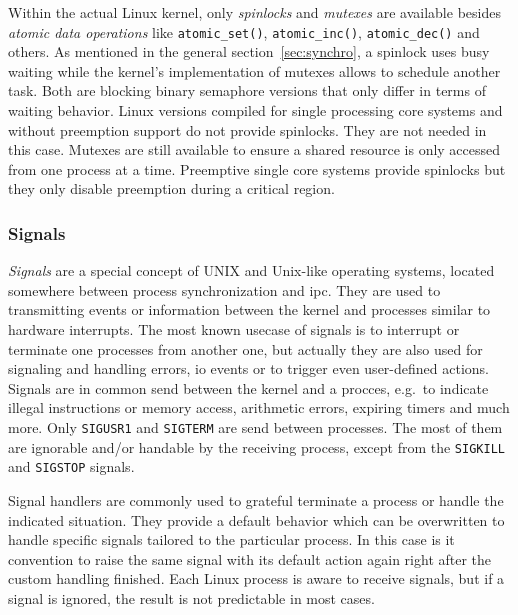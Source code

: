 Within the actual Linux kernel, only \textit{spinlocks} and \textit{mutexes} are available besides \textit{atomic data operations} like \texttt{atomic\_set()}, \texttt{atomic\_inc()}, \texttt{atomic\_dec()} and others\cite{achilles2006betriebssysteme}.
As mentioned in the general section~\ref{sec:synchro}, a spinlock uses busy waiting while the kernel's implementation of mutexes allows to schedule another task.
Both are blocking binary semaphore versions that only differ in terms of waiting behavior\cite{linux-locking}.
Linux versions compiled for single processing core systems and without preemption support do not provide spinlocks.
They are not needed in this case.
Mutexes are still available to ensure a shared resource is only accessed from one process at a time.
Preemptive single core systems provide spinlocks but they only disable preemption during a critical region\cite{linux-locking}.

\subsubsection*{Signals}
\textit{Signals} are a special concept of UNIX and Unix-like operating systems, located somewhere between process synchronization and \ac{ipc}.
They are used to transmitting events or information between the kernel and processes similar to hardware interrupts\cite{glatz2015betriebssysteme}.
The most known usecase of signals is to interrupt or terminate one processes from another one, but actually they are also used for signaling and handling errors, \ac{io} events or to trigger even user-defined actions\cite{achilles2006betriebssysteme}.
Signals are in common send between the kernel and a procces, e.g.\ to indicate illegal instructions or memory access, arithmetic errors, expiring timers and much more.
Only \texttt{SIGUSR1} and \texttt{SIGTERM} are send between processes.
The most of them are ignorable and/or handable by the receiving process, except from the \texttt{SIGKILL} and \texttt{SIGSTOP} signals\cite{achilles2006betriebssysteme}.

Signal handlers are commonly used to grateful terminate a process or handle the indicated situation.
They provide a default behavior which can be overwritten to handle specific signals tailored to the particular process.
In this case is it convention to raise the same signal with its default action again right after the custom handling finished\cite{achilles2006betriebssysteme}.
Each Linux process is aware to receive signals, but if a signal is ignored, the result is not predictable in most cases. 

